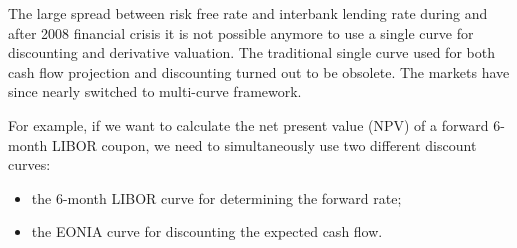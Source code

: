 The large spread between risk free rate and interbank lending rate during and after 2008 financial crisis it is not possible anymore to use a single curve for discounting and derivative valuation. The traditional single curve used for both  cash flow projection and discounting turned out to be obsolete. The markets have since nearly switched to multi-curve framework. 

For example, if we want to calculate the net present value (NPV) of a forward 6-month LIBOR coupon, we need to simultaneously use two different discount curves: 

\begin{itemize}
\tightlist
\item the 6-month LIBOR curve for determining the forward rate;
\item the EONIA curve for discounting the expected cash flow.
\end{itemize}


